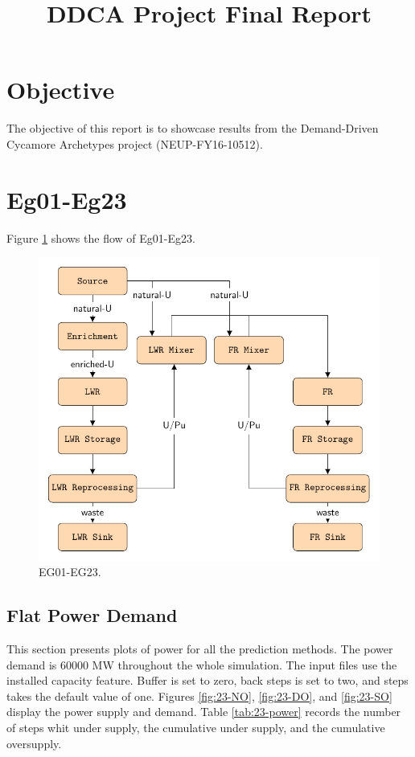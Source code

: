 \documentclass[11pt]{article}
\begin{document}
\title{DDCA Project Final Report}
\maketitle
\tableofcontents

\pagebreak

\section{Objective}
The objective of this report is to showcase results from the  
Demand-Driven Cycamore Archetypes project (NEUP-FY16-10512). 

\section{Eg01-Eg23}

Figure \ref{fig:23flow} shows the flow of Eg01-Eg23.

\begin{figure}[H]
	\centering
	\includegraphics[width=\textwidth]{23-figures/23flow.pdf} 
	\hfill
	\caption{EG01-EG23.}
	\label{fig:23flow}
\end{figure}

\subsection{Flat Power Demand}

This section presents plots of power for all the prediction methods. The power demand is 60000 MW throughout the whole simulation. The input files use the installed capacity feature. Buffer is set to zero, back steps is set to two, and steps takes the default value of one.
Figures \ref{fig:23-NO}, \ref{fig:23-DO}, and \ref{fig:23-SO} display the power supply and demand.
Table \ref{tab:23-power} records the number of steps whit under supply, the cumulative under supply, and the cumulative oversupply.
\end{document}
